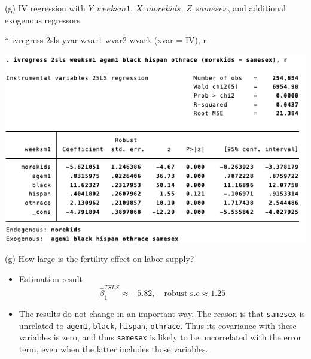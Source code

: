 \documentclass[
  10pt,
  ignorenonframetext,
]{beamer}
\newenvironment{Shaded}{\begin{snugshade}}{\end{snugshade}}
\newcommand{\FunctionTok}[1]{\textcolor[rgb]{0.00,0.00,0.00}{#1}}
\newcommand{\NormalTok}[1]{#1}
\begin{document}
\begin{frame}[fragile]{(g) IV regression with \(Y:weeksm1\),
\(X:morekids\), \(Z:samesex\), and additional exogenous regressors}
\protect\hypertarget{g-iv-regression-with-yweeksm1-xmorekids-zsamesex-and-additional-exogenous-regressors}{}
\small

\begin{Shaded}
\begin{Highlighting}[]
\NormalTok{* ivregress 2sls yvar wvar1 wvar2 wvark (xvar = IV), }\FunctionTok{r}
\end{Highlighting}
\end{Shaded}

\begin{center}\includegraphics[width=0.8\linewidth]{pictures/res6-ivregress2SLS} \end{center}
\end{frame}

\begin{frame}[fragile]{(g) How large is the fertility effect on labor
supply?}
\protect\hypertarget{g-how-large-is-the-fertility-effect-on-labor-supply}{}
\begin{itemize}
\item
  Estimation result \[
  \hat{\beta}_1^{TSLS} \approx -5.82, \quad \text{robust s.e} \approx 1.25 
  \]
\item
  The results do not change in an important way. The reason is that
  \texttt{samesex} is unrelated to \texttt{agem1}, \texttt{black},
  \texttt{hispan}, \texttt{othrace}. Thus its covariance with these
  variables is zero, and thus \texttt{samesex} is likely to be
  uncorrelated with the error term, even when the latter includes those
  variables.
\end{itemize}
\end{frame}
\end{document}

